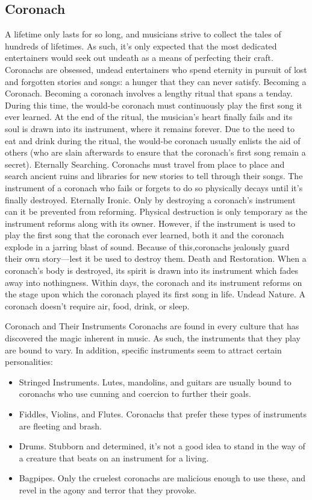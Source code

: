 \documentclass[10pt,a4paper,twoside,twocolumn,openany,bg=print,nodeprecatedcode]{dndbook}
\begin{document}
\subsection{Coronach}
A lifetime only lasts for so long, and musicians strive to collect the tales of hundreds of lifetimes. As such, it's only expected that the most dedicated entertainers would seek out undeath as a means of perfecting their craft. Coronachs are obsessed, undead entertainers who spend eternity in pursuit of lost and forgotten stories and songs: a hunger that they can never satisfy.
Becoming a Coronach. Becoming a coronach involves a lengthy ritual that spans a tenday. During this time, the would-be coronach must continuously play the first song it ever learned. At the end of the ritual, the musician's heart finally fails and its soul is drawn into its instrument, where it remains forever. Due to the need to eat and drink during the ritual, the would-be coronach usually enlists the aid of others (who are slain afterwards to ensure that the coronach's first song remain a secret).
Eternally Searching. Coronachs must travel from place to place and search ancient ruins and libraries for new stories to tell through their songs. The instrument of a coronach who fails or forgets to do so physically decays until it's finally destroyed.
Eternally Ironic. Only by destroying a coronach's instrument can it be prevented from reforming. Physical destruction is only temporary as the instrument reforms along with its owner. However, if the instrument is used to play the first song that the coronach ever learned, both it and the coronach explode in a jarring blast of sound. Because of this,coronachs jealously guard their own story—lest it be used to destroy them.
Death and Restoration. When a coronach's body is destroyed, its spirit is drawn into its instrument which fades away into nothingness. Within days, the coronach and its instrument reforms on the stage upon which the coronach played its first song in life.
Undead Nature. A coronach doesn't require air, food, drink, or sleep.
\begin{DndComment}{Coronach and Their Instruments}
Coronachs are found in every culture that has discovered the magic inherent in music. As such, the instruments that they play are bound to vary. In addition, specific instruments seem to attract certain personalities:

\begin{itemize}
\item Stringed Instruments. Lutes, mandolins, and guitars are usually bound to coronachs who use cunning and coercion to further their goals.
\item Fiddles, Violins, and Flutes. Coronachs that prefer these types of instruments are fleeting and brash.
\item Drums. Stubborn and determined, it's not a good idea to stand in the way of a creature that beats on an instrument for a living.
\item Bagpipes. Only the cruelest coronachs are malicious enough to use these, and revel in the agony and terror that they provoke.
\end{itemize}

\end{DndComment}
\end{document}
